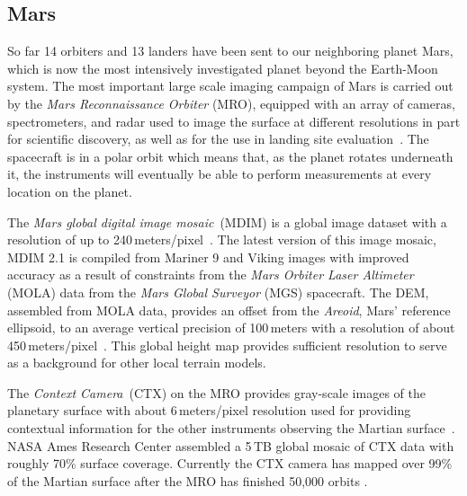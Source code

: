 \documentclass[journal]{vgtc}                %
\begin{document}

\subsection{Mars} \label{sec:scenario:mars}
So far 14 orbiters and 13 landers have been sent to our neighboring planet Mars, which is now the most intensively investigated planet beyond the Earth-Moon system.
The most important large scale imaging campaign of Mars is carried out by the \emph{Mars Reconnaissance Orbiter} (MRO), equipped with an array of cameras, spectrometers, and radar used to image the surface at different resolutions in part for scientific discovery, as well as for the use in landing site evaluation~\cite{zurek2007overview}.
The spacecraft is in a polar orbit which means that, as the planet rotates underneath it, the instruments will eventually be able to perform measurements at every location on the planet.

The \emph{Mars global digital image mosaic}~(MDIM) is a global image dataset with a resolution of up to 240\,meters/pixel~\cite{archinal2003mars}.
The latest version of this image mosaic, MDIM 2.1 is compiled from Mariner 9 and Viking images with improved accuracy as a result of constraints from the \emph{Mars Orbiter Laser Altimeter} (MOLA) data from the \emph{Mars Global Surveyor} (MGS) spacecraft.
The DEM, assembled from MOLA data, provides an offset from the \emph{Areoid}, Mars' reference ellipsoid, to an average vertical precision of 100\,meters with a resolution of about 450\,meters/pixel~\cite{smith2001mars}.
This global height map provides sufficient resolution to serve as a background for other local terrain models.

The \emph{Context Camera}~(CTX) on the MRO provides gray-scale images of the planetary surface with about 6\,meters/pixel resolution used for providing contextual information for the other instruments observing the Martian surface~\cite{zurek2007overview}.
NASA Ames Research Center assembled a 5\,TB global mosaic of CTX data with roughly 70\% surface coverage.
Currently the CTX camera has mapped over 99\% of the Martian surface after the MRO has finished 50,000 orbits \cite{mroorbit}.
\end{document}
